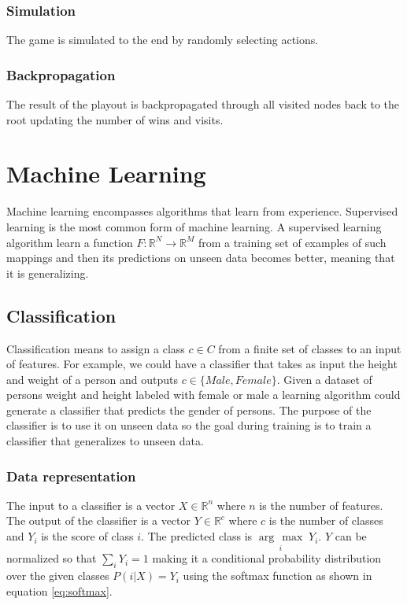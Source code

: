 \documentclass{kththesis}
\begin{document}
\subsubsection{Simulation}
The game is simulated to the end by randomly selecting actions.

\subsubsection{Backpropagation}
The result of the playout is backpropagated through all visited nodes back to the root updating the number of wins and visits.


\section{Machine Learning}
Machine learning  encompasses algorithms that learn from experience. Supervised learning is the most common form of machine learning. A supervised learning algorithm learn a function $F: \mathbb{R}^{N} \rightarrow \mathbb{R}^{M}$ from a training set of examples of such mappings and then its predictions on unseen data becomes better, meaning that it is generalizing. 

\subsection{Classification}
Classification means to assign a class $c \in C$ from a finite set  of classes to an input of features. For example, we could have a classifier that takes as input  the height and weight of a person and outputs $c \in \{Male, Female\}$. Given a dataset of persons weight and height  labeled with female or male  a  learning algorithm could generate a classifier that predicts the gender of persons.  The purpose of the classifier is to use it on unseen data so the goal during training is to train a classifier that generalizes to unseen data.

\newcommand{\argmax}[1]{\underset{#1}{\operatorname{arg}\,\operatorname{max}}\;}
\subsubsection{Data representation}
\label{sec:machine_learning:data_representation}
The input to a classifier is a vector $X \in \mathbb{R}^{n}$ where $n$ is the  number of features.
The output of the classifier is a vector $Y \in \mathbb{R}^{c}$ where $c$ is the number of classes and $Y_{i}$ is the score of class $i$. The predicted class is $\argmax{i}Y_{i}$. $Y$ can be normalized so that $\sum_{i}Y_{i}=1$ making it a conditional probability distribution over the given classes $P(i|X)=Y_i$ using the softmax function as shown in equation \ref{eq:softmax}. 
\end{document}
